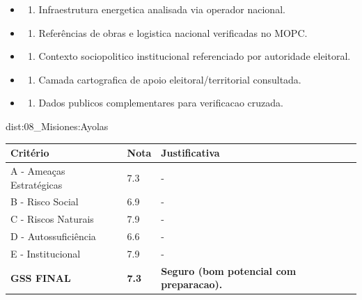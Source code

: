 {\begin{itemize}
\item
  \begin{enumerate}
  \def\labelenumi{\arabic{enumi})}
  \setcounter{enumi}{7}
  \tightlist
  \item
    Infraestrutura energetica analisada via operador nacional.
  \end{enumerate}
\item
  \begin{enumerate}
  \def\labelenumi{\arabic{enumi})}
  \setcounter{enumi}{8}
  \tightlist
  \item
    Referências de obras e logistica nacional verificadas no MOPC.
  \end{enumerate}
\item
  \begin{enumerate}
  \def\labelenumi{\arabic{enumi})}
  \setcounter{enumi}{9}
  \tightlist
  \item
    Contexto sociopolitico institucional referenciado por autoridade
    eleitoral.
  \end{enumerate}
\item
  \begin{enumerate}
  \def\labelenumi{\arabic{enumi})}
  \setcounter{enumi}{10}
  \tightlist
  \item
    Camada cartografica de apoio eleitoral/\allowbreak territorial consultada.
  \end{enumerate}
\item
  \begin{enumerate}
  \def\labelenumi{\arabic{enumi})}
  \setcounter{enumi}{11}
  \tightlist
  \item
    Dados publicos complementares para verificacao cruzada.
  \end{enumerate}
\end{itemize}}{dist:08_Misiones:Ayolas}
\begin{table}[ht!]
\small \begin{tabular}{p{3.0cm}p{0.8cm}p{6.0cm}} \toprule
\textbf{Critério} & \textbf{Nota} & \textbf{Justificativa} \\ \midrule
A - Ameaças Estratégicas & 7.3 & - \\
B - Risco Social & 6.9 & - \\
C - Riscos Naturais & 7.9 & - \\
D - Autossuficiência & 6.6 & - \\
E - Institucional & 7.9 & - \\
\midrule \textbf{GSS FINAL} & \textbf{7.3} & \textbf{Seguro (bom potencial com preparacao).} \\ \bottomrule \end{tabular}
\end{table}
